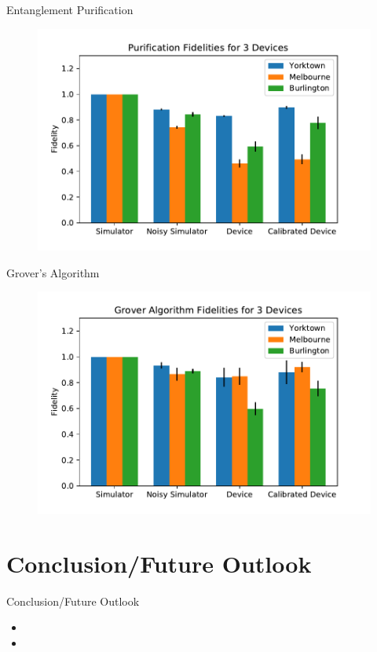 \begin{frame}{Entanglement Purification}
\begin{figure}
	\includegraphics[width=1\textwidth]{images/results/purification_histogram.pdf}
\end{figure}
\end{frame}

\begin{frame}{Grover's Algorithm}
\begin{figure}
	\includegraphics[width=1\textwidth]{images/results/grover_histogram.pdf}
\end{figure}
\end{frame}

\section{Conclusion/Future Outlook}
\begin{frame}{Conclusion/Future Outlook}
\begin{itemize}
	\item 
	\item 
\end{itemize}
\end{frame}
